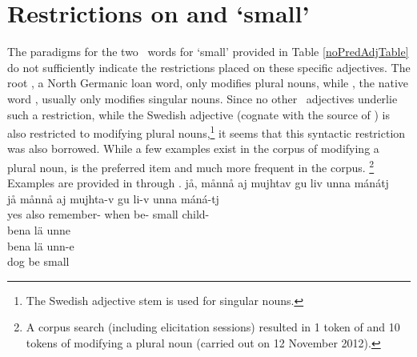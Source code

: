 \section{Restrictions on  and  ‘small’}\label{smallADJs}
The paradigms for the two \PS\ words for ‘small’ provided in Table \vref{noPredAdjTable} do not sufficiently indicate the restrictions placed on these specific adjectives. The root , a North Germanic loan word, only modifies plural nouns, while \mbox{,} %
the native word \citep[265]{Sammallahti1998}, usually only modifies singular nouns. 
Since no other \PS\ adjectives underlie such a restriction, while the Swedish adjective  (cognate with the source of ) is also restricted to modifying plural nouns,\footnote{The Swedish adjective stem  is used for singular nouns.} 
it seems that this syntactic restriction was also borrowed. While a few examples exist in the corpus of  modifying a plural noun,  is the preferred item and much more frequent in the corpus.%
\footnote{A corpus search (including elicitation sessions) resulted in 1 token of  and 10 tokens of  modifying a plural noun (carried out on 12 November 2012).} 
Examples are provided in  through .
\ea\label{smallADJex1}
\glll	jå, månnå aj mujhtav gu liv unna mánátj\\
	jå månnå aj mujhta-v gu li-v unna máná-tj\\
	yes  also remember- when be- small child-\BS{}\\\nopagebreak
{}	
\z
\ea\label{smallADJex2}
\glll	bena lä unne\\
	bena lä unn-e\\
	dog\BS{} be\BS{} small\BS{}\\\nopagebreak
{}	
